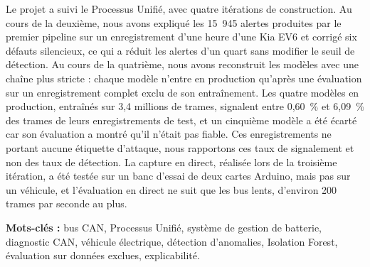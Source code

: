 Le projet a suivi le Processus Unifié, avec quatre itérations de construction. Au cours de la deuxième, nous avons expliqué les 15~945 alertes produites par le premier pipeline sur un enregistrement d'une heure d'une Kia EV6 et corrigé six défauts silencieux, ce qui a réduit les alertes d'un quart sans modifier le seuil de détection. Au cours de la quatrième, nous avons reconstruit les modèles avec une chaîne plus stricte : chaque modèle n'entre en production qu'après une évaluation sur un enregistrement complet exclu de son entraînement. Les quatre modèles en production, entraînés sur 3,4 millions de trames, signalent entre 0,60~\% et 6,09~\% des trames de leurs enregistrements de test, et un cinquième modèle a été écarté car son évaluation a montré qu'il n'était pas fiable. Ces enregistrements ne portant aucune étiquette d'attaque, nous rapportons ces taux de signalement et non des taux de détection. La capture en direct, réalisée lors de la troisième itération, a été testée sur un banc d'essai de deux cartes Arduino, mais pas sur un véhicule, et l'évaluation en direct ne suit que les bus lents, d'environ 200 trames par seconde au plus.

\enlargethispage{3\baselineskip}
\vspace{0.3cm}
\noindent\textbf{Mots-clés :} bus CAN, Processus Unifié, système de gestion de batterie, diagnostic CAN, véhicule électrique, détection d'anomalies, Isolation Forest, évaluation sur données exclues, explicabilité.

\cleardoublepage
